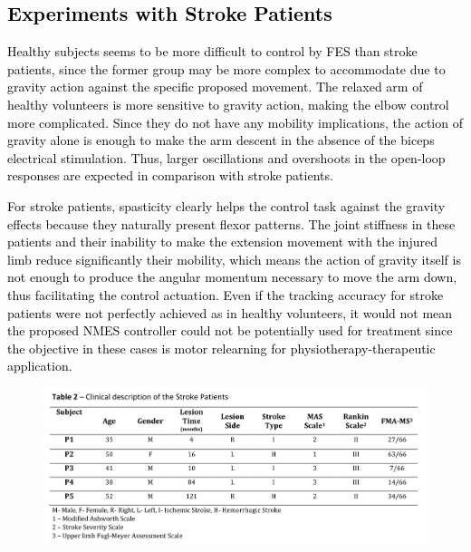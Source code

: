 \documentclass[review]{elsarticle}
\begin{document}
\newpage


\textcolor{black}{
\subsection{Experiments with Stroke Patients}
}
 
\textcolor{black}{Healthy subjects seems to be more difficult to control by FES than stroke patients, since the former group may be more complex to accommodate due to gravity action against the specific proposed movement. The relaxed arm of healthy volunteers is more sensitive to gravity action, making the elbow control more complicated. Since they do not have any mobility implications, the action of gravity alone is enough to make the arm descent in the absence of the biceps electrical stimulation. Thus, larger oscillations and overshoots in the open-loop responses are expected in comparison with stroke patients.} 

\textcolor{black}{For stroke patients, spasticity clearly helps the control task against the gravity effects because they naturally present  flexor patterns. The joint stiffness in these patients and their inability to make the extension movement with the injured limb reduce significantly their mobility, which means the action of gravity itself is not enough to produce the angular momentum necessary to move the arm down, thus facilitating the control actuation. Even if the tracking accuracy for stroke patients were not perfectly achieved as in healthy volunteers, it would not mean the proposed NMES controller could not be potentially used for treatment since the objective in these cases is motor relearning for physiotherapy-therapeutic application.}
%
\begin{figure}[!htb]
\hspace{-0.1\textwidth}
\includegraphics[width=1.2\textwidth]{Table2.png}
\label{table2}
\end{figure}
\end{document}

